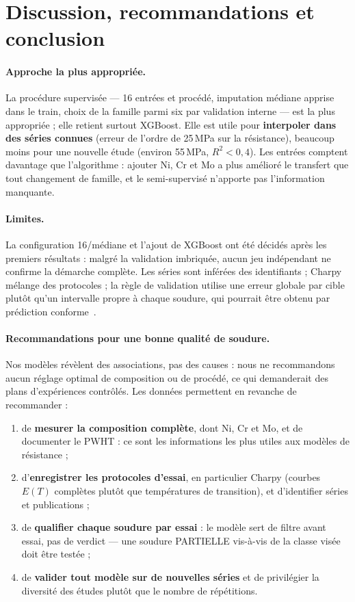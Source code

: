 \documentclass[11pt,a4paper]{article}
\begin{document}
\section{Discussion, recommandations et conclusion}
\label{sec:conclusion}

\paragraph{Approche la plus appropriée.} La procédure supervisée --- 16 entrées
et procédé, imputation médiane apprise dans le train, choix de la famille parmi
six par validation interne --- est la plus appropriée ; elle retient surtout
XGBoost. Elle est utile pour \textbf{interpoler dans des séries connues} (erreur
de l'ordre de 25\,MPa sur la résistance), beaucoup moins pour une nouvelle étude
(environ 55\,MPa, $R^2 < 0{,}4$). Les entrées comptent davantage que l'algorithme :
ajouter Ni, Cr et Mo a plus amélioré le transfert que tout changement de famille,
et le semi-supervisé n'apporte pas l'information manquante.

\paragraph{Limites.} La configuration 16/médiane et l'ajout de XGBoost ont été
décidés après les premiers résultats : malgré la validation imbriquée, aucun jeu
indépendant ne confirme la démarche complète. Les séries sont inférées des
identifiants ; Charpy mélange des protocoles ; la règle de validation utilise une
erreur globale par cible plutôt qu'un intervalle propre à chaque soudure, qui
pourrait être obtenu par prédiction conforme~\cite{barber_2021}.

\paragraph{Recommandations pour une bonne qualité de soudure.} Nos modèles
révèlent des associations, pas des causes : nous ne recommandons aucun réglage
\og optimal \fg{} de composition ou de procédé, ce qui demanderait des plans
d'expériences contrôlés. Les données permettent en revanche de recommander :
\begin{enumerate}
  \item de \textbf{mesurer la composition complète}, dont Ni, Cr et Mo, et de documenter le PWHT : ce sont les informations les plus utiles aux modèles de résistance ;
  \item d'\textbf{enregistrer les protocoles d'essai}, en particulier Charpy (courbes $E(T)$ complètes plutôt que températures de transition), et d'identifier séries et publications ;
  \item de \textbf{qualifier chaque soudure par essai} : le modèle sert de filtre avant essai, pas de verdict --- une soudure PARTIELLE vis-à-vis de la classe visée doit être testée ;
  \item de \textbf{valider tout modèle sur de nouvelles séries} et de privilégier la diversité des études plutôt que le nombre de répétitions.
\end{enumerate}
\end{document}
